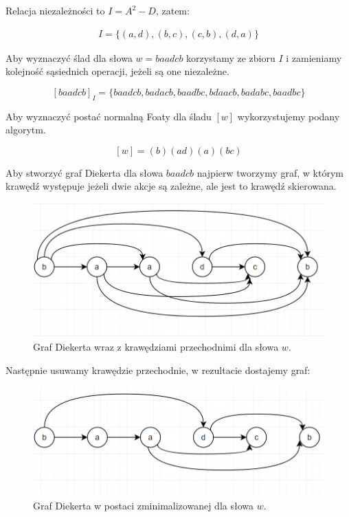 \documentclass[11pt]{article}
\begin{document}
Relacja niezależności to \(I = A^2 - D\), zatem:

\begin{align*}
I = \{(a, d), (b, c), (c, b), (d, a) \}
\end{align*}

Aby wyznaczyć ślad dla słowa \(w = baadcb\) korzystamy ze zbioru \(I\) i zamieniamy
kolejność sąsiednich operacji, jeżeli są one niezależne.

$$[baadcb]_I = \{baadcb, badacb, baadbc, bdaacb, badabc, baadbc   \}$$

Aby wyznaczyć postać normalną Foaty dla śladu \([w]\) wykorzystujemy podany algorytm.

$$[w] = (b)(ad)(a)(bc)$$

Aby stworzyć graf Diekerta dla słowa \(baadcb\) najpierw tworzymy graf, w którym krawędź występuje jeżeli dwie akcje są zależne, ale jest to krawędź skierowana.

\begin{figure}[H]
\centering
\includegraphics[width=.9\linewidth]{./graph1_1.png}
\caption{Graf Diekerta wraz z krawędziami przechodnimi dla słowa \(w\).}
\end{figure}

Następnie usuwamy krawędzie przechodnie, w rezultacie dostajemy graf:

\begin{figure}[H]
\centering
\includegraphics[width=.9\linewidth]{./graph1_2.png}
\caption{Graf Diekerta w postaci zminimalizowanej dla słowa \(w\).}
\end{figure}
\end{document}
